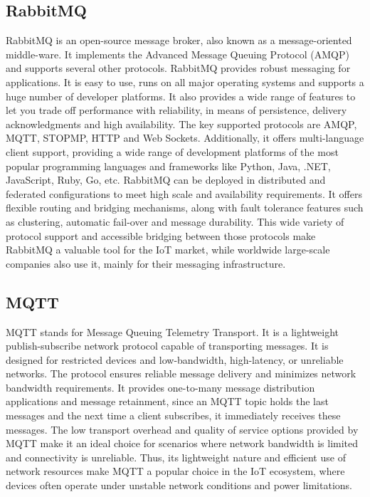 \subsection{RabbitMQ}
RabbitMQ \cite{RabbitMQ} is an open-source message broker, also known as a message-oriented middle-ware. It implements the Advanced Message Queuing Protocol (AMQP) and supports several other protocols. RabbitMQ provides robust messaging for applications. It is easy to use, runs on all major operating systems and supports a huge number of developer platforms. It also provides a wide range of features to let you trade off performance with reliability, in means of persistence, delivery acknowledgments and high availability. The key supported protocols are AMQP, MQTT, STOPMP, HTTP and Web Sockets. Additionally, it offers multi-language client support, providing a wide range of development platforms of the most popular programming languages and frameworks like Python, Java, .NET, JavaScript, Ruby, Go, etc. RabbitMQ can be deployed in distributed and federated configurations to meet high scale and availability requirements. It offers flexible routing and bridging mechanisms, along with fault tolerance features such as clustering, automatic fail-over and message durability. This wide variety of protocol support and accessible bridging between those protocols make RabbitMQ a valuable tool for the IoT market, while worldwide large-scale companies also use it, mainly for their messaging infrastructure.
\subsection{MQTT}
MQTT \cite{MQTT} stands for Message Queuing Telemetry Transport. It is a lightweight publish-subscribe network protocol capable of transporting messages. It is designed for restricted devices and low-bandwidth, high-latency, or unreliable networks. The protocol ensures reliable message delivery and minimizes network bandwidth requirements. It provides one-to-many message distribution applications and message retainment, since an MQTT topic holds the last messages and the next time a client subscribes, it immediately receives these messages. The low transport overhead and quality of service options provided by MQTT make it an ideal choice for scenarios where network bandwidth is limited and connectivity is unreliable. Thus, its lightweight nature and efficient use of network resources make MQTT a popular choice in the IoT ecosystem, where devices often operate under unstable network conditions and power limitations.


